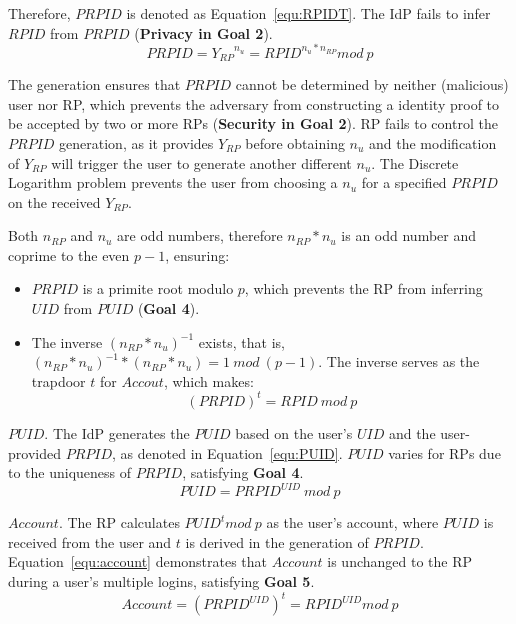 Therefore, $PRPID$ is denoted as Equation~\ref{equ:RPIDT}. The IdP fails to infer ${RPID}$ from $PRPID$ (\textbf{Privacy in Goal 2}).
   \begin{equation}
   PRPID = {Y_{RP}}^{n_{u}} = {RPID}^{n_{u}* n_{RP}} mod \ p
   \label{equ:RPIDT}
   \end{equation}

The generation ensures that $PRPID$ cannot be determined by neither (malicious) user nor RP, which prevents the adversary from constructing a identity proof to be accepted by two or more RPs (\textbf{Security in Goal 2}). RP fails to control the $PRPID$ generation, as it provides $Y_{RP}$ before obtaining $n_{u}$ and the modification of $Y_{RP}$ will trigger the user to generate another different  $n_{u}$. The Discrete Logarithm problem prevents the user from choosing a $n_{u}$ for a specified $PRPID$ on the received $Y_{RP}$.

Both $n_{RP}$ and $n_{u}$ are odd numbers, therefore $n_{RP}*n_{u}$ is an odd number and coprime to the even $p-1$, ensuring:
 \begin{itemize}
   \item $PRPID$ is a primite root modulo $p$, which prevents the RP from inferring $UID$ from $PUID$ (\textbf{Goal 4}).
   \item The inverse $(n_{RP}*n_{u})^{-1}$ exists, that is, $(n_{RP}*n_{u})^{-1} * (n_{RP}*n_{u}) = 1 \ mod \ (p-1)$. The inverse  serves as  the trapdoor $t$ for $Accout$, which makes:
   \begin{equation}
   (PRPID)^t = RPID \ mod \ p
   \label{equ:trapdoor}
   \end{equation}
 \end{itemize}

{$PUID$}. The IdP generates the $PUID$ based on the user's $UID$ and the user-provided $PRPID$, as denoted in Equation~\ref{equ:PUID}. $PUID$ varies for RPs due to the uniqueness of $PRPID$, satisfying \textbf{Goal 4}.
 \begin{equation}
   PUID = {PRPID}^{UID} \ mod \ p
   \label{equ:PUID}
   \end{equation}

{$Account$}. The RP calculates $PUID^t mod \ p$ as the  user's account, where $PUID$ is received from the user and $t$ is derived in the generation of $PRPID$. Equation~\ref{equ:account} demonstrates that $Account$ is unchanged to the RP during a user's multiple logins, satisfying \textbf{Goal 5}.
 \begin{equation}
   Account = ({PRPID}^{UID})^t = {RPID}^{UID} mod \ p
   \label{equ:account}
   \end{equation}


